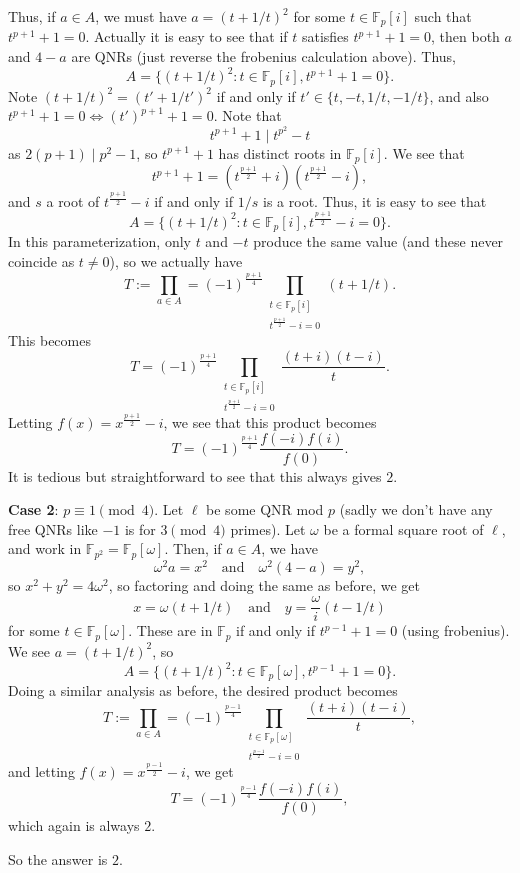 \begin{enumerate}
 Thus, if $a\in A$, we must have $a=(t+1/t)^2$ for some $t\in\mathbb{F}_p[i]$ such that $t^{p+1}+1=0$. Actually it is easy to see that if $t$ satisfies $t^{p+1}+1=0$, then both $a$ and $4-a$ are QNRs (just reverse the frobenius calculation above). Thus, 
 \[A = \{(t+1/t)^2 : t\in\mathbb{F}_p[i], t^{p+1}+1=0\}.\] Note $(t+1/t)^2 = (t'+1/t')^2$ if and only if $t'\in\{t,-t,1/t,-1/t\}$, and also $t^{p+1}+1=0\iff (t')^{p+1}+1=0$. Note that 
 \[t^{p+1}+1\mid t^{p^2}-t\] as $2(p+1)\mid p^2-1$, so $t^{p+1}+1$ has distinct roots in $\mathbb{F}_p[i]$. We see that 
 \[t^{p+1}+1=(t^{\frac{p+1}{2}}+i)(t^{\frac{p+1}{2}}-i),\] and $s$ a root of $t^{\frac{p+1}{2}}-i$ if and only if $1/s$ is a root. Thus, it is easy to see that 
 \[A = \{(t+1/t)^2 : t\in\mathbb{F}_p[i], t^{\frac{p+1}{2}}-i=0\}.\] In this parameterization, only $t$ and $-t$ produce the same value (and these never coincide as $t\ne 0$), so we actually have 
 \[T:=\prod_{a\in A}=(-1)^{\frac{p+1}{4}}\prod_{\substack{t\in\mathbb{F}_p[i]\\t^{\frac{p+1}{2}}-i=0}}(t+1/t).\] This becomes 
 \[T=(-1)^{\frac{p+1}{4}}\prod_{\substack{t\in\mathbb{F}_p[i]\\t^{\frac{p+1}{2}}-i=0}}\frac{(t+i)(t-i)}{t}.\] Letting $f(x)=x^{\frac{p+1}{2}}-i$, we see that this product becomes 
 \[T=(-1)^{\frac{p+1}{4}}\frac{f(-i)f(i)}{f(0)}.\] It is tedious but straightforward to see that this always gives $2$.

 \textbf{Case 2}: $p\equiv 1\pmod{4}$. Let $\ell$ be some QNR mod $p$ (sadly we don't have any free QNRs like $-1$ is for $3\pmod{4}$ primes). Let $\omega$ be a formal square root of $\ell$, and work in $\mathbb{F}_{p^2} = \mathbb{F}_p[\omega]$. Then, if $a\in A$, we have 
 \[\omega^2 a = x^2\quad\text{and}\quad\omega^2(4-a)=y^2,\] so $x^2+y^2=4\omega^2$, so factoring and doing the same as before, we get 
 \[x=\omega(t+1/t)\quad\text{and}\quad y=\frac{\omega}{i}(t-1/t)\] for some $t\in\mathbb{F}_p[\omega]$. These are in $\mathbb{F}_p$ if and only if $t^{p-1}+1=0$ (using frobenius). We see $a=(t+1/t)^2$, so 
 \[A = \{(t+1/t)^2 : t\in\mathbb{F}_p[\omega], t^{p-1}+1=0\}.\] Doing a similar analysis as before, the desired product becomes 
 \[T:=\prod_{a\in A}=(-1)^{\frac{p-1}{4}}\prod_{\substack{t\in\mathbb{F}_p[\omega]\\t^{\frac{p-1}{2}}-i=0}}\frac{(t+i)(t-i)}{t},\] and letting $f(x)=x^{\frac{p-1}{2}}-i$, we get 
 \[T=(-1)^{\frac{p-1}{4}}\frac{f(-i)f(i)}{f(0)},\] which again is always $2$.

 So the answer is $\boxed{2}$.


\end{enumerate}
